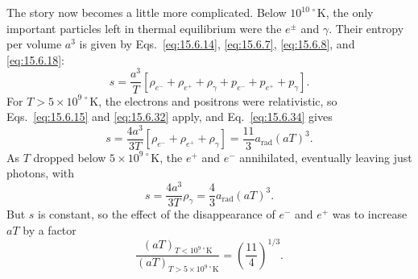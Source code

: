 The story now becomes a little more complicated. Below \(10^{10\,\circ}\mathrm
K\), the only important particles left in thermal equilibrium were the
\(e^\pm\) and \(\gamma\). Their entropy per volume \(a^3\) is given by
Eqs.~\eqref{eq:15.6.14}, \eqref{eq:15.6.7}, \eqref{eq:15.6.8}, and
\eqref{eq:15.6.18}:
\begin{equation}
  s
  =
  \frac{a^3}{T}
  [\rho_{e^-}+\rho_{e^+}+\rho_\gamma
  +p_{e^-}+p_{e^+}+p_\gamma].
  \tag{15.6.34}\label{eq:15.6.34}
\end{equation}
For \(T>5\times10^{9\,\circ}\mathrm K\), the electrons and positrons were
relativistic, so Eqs.~\eqref{eq:15.6.15} and \eqref{eq:15.6.32} apply, and
Eq.~\eqref{eq:15.6.34} gives
\begin{equation}
  s
  =
  \frac{4a^3}{3T}
  [\rho_{e^-}+\rho_{e^+}+\rho_\gamma]
  =
  \frac{11}{3}a_{\mathrm{rad}}(aT)^3.
  \tag{15.6.35}\label{eq:15.6.35}
\end{equation}
As \(T\) dropped below \(5\times10^{9\,\circ}\mathrm K\), the \(e^+\) and
\(e^-\) annihilated, eventually leaving just photons, with
\begin{equation}
  s
  =
  \frac{4a^3}{3T}\rho_\gamma
  =
  \frac43a_{\mathrm{rad}}(aT)^3.
  \tag{15.6.36}\label{eq:15.6.36}
\end{equation}
But \(s\) is constant, so the effect of the disappearance of \(e^-\) and
\(e^+\) was to increase \(aT\) by a factor
\begin{equation}
  \frac{(aT)_{T<10^{9\,\circ}\mathrm K}}
       {(aT)_{T>5\times10^{9\,\circ}\mathrm K}}
  =
  \left(\frac{11}{4}\right)^{1/3}.
  \tag{15.6.37}\label{eq:15.6.37}
\end{equation}

